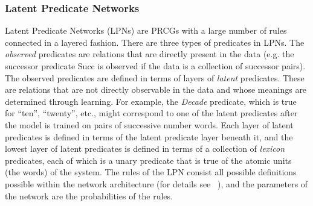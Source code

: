 \documentclass[10pt,letterpaper]{article}
\begin{document}


\subsubsection{Latent Predicate Networks}


Latent Predicate Networks (LPNs) are PRCGs with a large number of
rules connected in a layered fashion. There are three types of
predicates in LPNs. The \emph{observed} predicates are relations that
are directly present in the data (e.g. the successor predicate Succ is
observed if the data is a collection of successor pairs). The observed
predicates are defined in terms of layers of \emph{latent}
predicates. These are relations that are not directly observable in
the data and whose meanings are determined through learning. For
example, the \emph{Decade} predicate, which is true for ``ten'',
``twenty'', etc., might correspond to one of the latent predicates
after the model is trained on pairs of successive number words. Each
layer of latent predicates is defined in terms of the latent predicate
layer beneath it, and the lowest layer of latent predicates is defined
in terms of a collection of \emph{lexicon} predicates, each of which
is a unary predicate that is true of the atomic units (the words) of
the system. The rules of the LPN consist all possible definitions
possible within the network architecture (for details see
~\cite{DecRulTen2015}), and the parameters of the network are the
probabilities of the rules.
\end{document}
